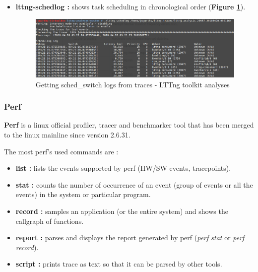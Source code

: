 \begin{itemize}
\begin{itemize}
			
			\item \textbf{lttng-schedlog : } shows task scheduling in chronological order (\textbf{Figure \ref{Getting sched-switch logs from traces - LTTng toolkit analyses}}).
					\begin{figure}[H]
						\centering
        				\includegraphics[scale=0.35]{img/solution/lttng-schedlog.png}
        				\caption{Getting sched\_switch logs from traces - LTTng toolkit analyses}
        				\label{Getting sched-switch logs from traces - LTTng toolkit analyses}
    				\end{figure}		
			
			
		\end{itemize}			
	
	
\end{itemize}


\subsubsection{Perf}
\textbf{Perf} is a linux official profiler, tracer and benchmarker tool that has been merged to the linux mainline since version 2.6.31.

The most perf's used commands are :
\begin{itemize}
	\item \textbf{list :} lists the events supported by perf (HW/SW events, tracepoints).
	\item \textbf{stat :} counts the number of occurrence of an event (group of events or all the events) in the system or
particular program.
	\item \textbf{record :} samples an application (or the entire system) and shows the callgraph of functions.
	\item \textbf{report :} parses and displays the report generated by perf (\emph{perf stat} or \emph{perf record}).
	\item \textbf{script :} prints trace as text so that it can be parsed by other tools.
\end{itemize}

